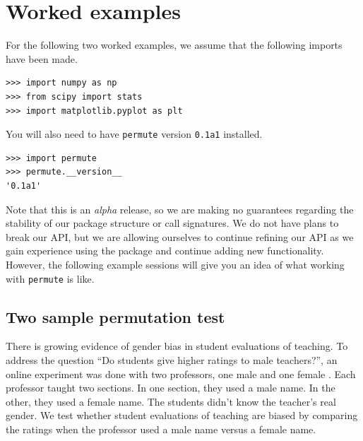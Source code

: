 \chapter{\label{app:ex}Worked examples}

For the following two worked examples, we assume that the following imports 
have been made.

\begin{verbatim}
>>> import numpy as np
>>> from scipy import stats
>>> import matplotlib.pyplot as plt
\end{verbatim}

You will also need to have \texttt{permute} version \texttt{0.1a1} installed.

\begin{verbatim}
>>> import permute
>>> permute.__version__
'0.1a1'
\end{verbatim}

Note that this is an \emph{alpha} release, so we are making no guarantees
regarding the stability of our package structure or call signatures.  We do not
have plans to break our API, but we are allowing ourselves to continue refining
our API as we gain experience using the package and continue adding new
functionality.  However, the following example sessions will give you an idea
of what working with \texttt{permute} is like.

\section{Two sample permutation test}

There is growing evidence of gender bias in student evaluations of teaching.
To address the question ``Do students give higher ratings to male teachers?'',
an online experiment was done with two professors, one male and one female
\cite{macnell2014s}.  Each professor taught two sections. In one section, they
used a male name.  In the other, they used a female name. The students didn't
know the teacher's real gender.  We test whether student evaluations of
teaching are biased by comparing the ratings when the professor used a male
name versus a female name.

